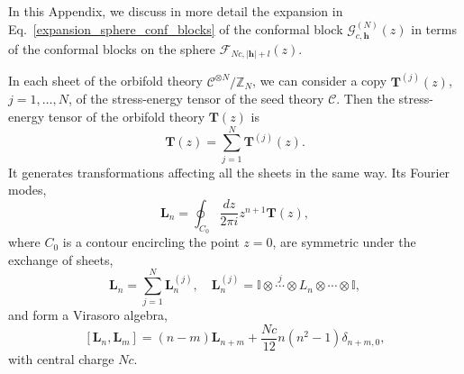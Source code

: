 \documentclass[a4paper,11pt]{article}
\begin{document}
In this Appendix, we discuss in more detail the expansion in Eq.~\eqref{expansion_sphere_conf_blocks} of the
conformal block $\mathcal{G}_{c, \boldsymbol{h}}^{(N)}(z)$ in terms of the conformal 
blocks on the sphere $\mathcal{F}_{Nc, |\boldsymbol{h}|+l}(z)$.

In each sheet of the orbifold theory $\mathcal{C}^{\otimes N}/\mathbb{Z}_N$, we 
can consider a copy $\boldsymbol{T}^{(j)}(z)$, $j=1,\dots, N$, of the stress-energy tensor of 
the seed theory $\mathcal{C}$. Then the stress-energy tensor of the 
orbifold theory $\boldsymbol{T}(z)$ is 
\begin{equation}\label{hatT}
 \boldsymbol{T}(z)=\sum_{j=1}^N \boldsymbol{T}^{(j)}(z).
\end{equation}
It generates transformations affecting all the sheets in the same way. 
Its Fourier modes,
\begin{equation}
 \boldsymbol{L}_n=\oint_{C_0}\frac{dz}{2\pi i} z^{n+1}\boldsymbol{T}(z),
\end{equation}
where $C_0$ is a contour encircling the point $z=0$, are symmetric 
under the exchange of sheets, 
\begin{equation}
 \boldsymbol{L}_n=\sum_{j=1}^N \boldsymbol{L}_n^{(j)}, \quad 
 \boldsymbol{L}_n^{(j)}=\mathbb{I}\otimes \overset{j}{\cdots} \otimes L_{n}\otimes \cdots \otimes \mathbb{I},
\end{equation}
and form a Virasoro algebra, 
\begin{equation}\label{symm_virasoro_alg}
 [\boldsymbol{L}_n, \boldsymbol{L}_{m}]=(n-m)\boldsymbol{L}_{n+m}+\frac{Nc}{12}n(n^2-1)\delta_{n+m, 0},
\end{equation}
with central charge $Nc$.
\end{document}
